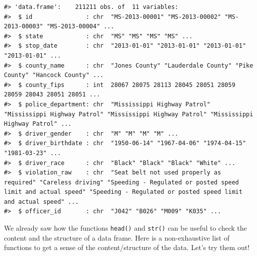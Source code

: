 \documentclass[
]{book}
\begin{document}
\begin{verbatim}
#> 'data.frame':    211211 obs. of  11 variables:
#>  $ id               : chr  "MS-2013-00001" "MS-2013-00002" "MS-2013-00003" "MS-2013-00004" ...
#>  $ state            : chr  "MS" "MS" "MS" "MS" ...
#>  $ stop_date        : chr  "2013-01-01" "2013-01-01" "2013-01-01" "2013-01-01" ...
#>  $ county_name      : chr  "Jones County" "Lauderdale County" "Pike County" "Hancock County" ...
#>  $ county_fips      : int  28067 28075 28113 28045 28051 28059 28059 28043 28051 28051 ...
#>  $ police_department: chr  "Mississippi Highway Patrol" "Mississippi Highway Patrol" "Mississippi Highway Patrol" "Mississippi Highway Patrol" ...
#>  $ driver_gender    : chr  "M" "M" "M" "M" ...
#>  $ driver_birthdate : chr  "1950-06-14" "1967-04-06" "1974-04-15" "1981-03-23" ...
#>  $ driver_race      : chr  "Black" "Black" "Black" "White" ...
#>  $ violation_raw    : chr  "Seat belt not used properly as required" "Careless driving" "Speeding - Regulated or posted speed limit and actual speed" "Speeding - Regulated or posted speed limit and actual speed" ...
#>  $ officer_id       : chr  "J042" "B026" "M009" "K035" ...
\end{verbatim}

We already saw how the functions \texttt{head()} and \texttt{str()} can be useful to check the
content and the structure of a data frame. Here is a non-exhaustive list of
functions to get a sense of the content/structure of the data. Let's try them out!
\end{document}
